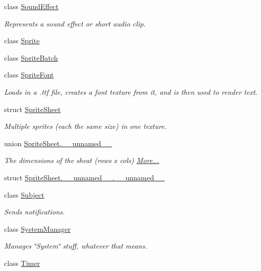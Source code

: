 \begin{DoxyCompactItemize}
class \hyperlink{classnta_1_1SoundEffect}{Sound\+Effect}
\begin{DoxyCompactList}\small\item\em Represents a sound effect or short audio clip. \end{DoxyCompactList}\item 
class \hyperlink{classnta_1_1Sprite}{Sprite}
\item 
class \hyperlink{classnta_1_1SpriteBatch}{Sprite\+Batch}
\item 
class \hyperlink{classnta_1_1SpriteFont}{Sprite\+Font}
\begin{DoxyCompactList}\small\item\em Loads in a .ttf file, creates a font texture from it, and is then used to render text. \end{DoxyCompactList}\item 
struct \hyperlink{structnta_1_1SpriteSheet}{Sprite\+Sheet}
\begin{DoxyCompactList}\small\item\em Multiple sprites (each the same size) in one texture. \end{DoxyCompactList}\item 
union \hyperlink{namespacenta_d1/d70/unionnta_1_1SpriteSheet_8____unnamed____}{Sprite\+Sheet.\+\_\+\+\_\+unnamed\+\_\+\+\_\+}
\begin{DoxyCompactList}\small\item\em The dimensions of the sheat (rows x cols)  \hyperlink{namespacenta_d1/d70/unionnta_1_1SpriteSheet_8____unnamed____}{More...}\end{DoxyCompactList}\item 
struct \hyperlink{namespacenta_df/d10/structnta_1_1SpriteSheet_8____unnamed_____8____unnamed____}{Sprite\+Sheet.\+\_\+\+\_\+unnamed\+\_\+\+\_\+.\+\_\+\+\_\+unnamed\+\_\+\+\_\+}
\item 
class \hyperlink{classnta_1_1Subject}{Subject}
\begin{DoxyCompactList}\small\item\em Sends notifications. \end{DoxyCompactList}\item 
class \hyperlink{classnta_1_1SystemManager}{System\+Manager}
\begin{DoxyCompactList}\small\item\em Manages \char`\"{}\+System\char`\"{} stuff, whatever that means. \end{DoxyCompactList}\item 
class \hyperlink{classnta_1_1Timer}{Timer}

\end{DoxyCompactItemize}
